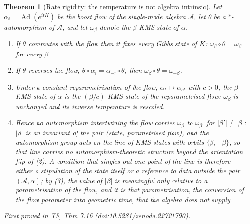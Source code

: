 \documentclass[11pt]{article}
\newtheorem{theorem}{Theorem}[section]
\theoremstyle{definition}
\theoremstyle{plain}
\providecommand{\Aa}{}\renewcommand{\Aa}{\mathcal{A}}
\begin{document}
\begin{theorem}[Rate rigidity: the temperature is not algebra intrinsic]\label{c:singularity.rate-rigidity-temperature-not-algebra-intrinsic}
Let $\alpha_t = \operatorname{Ad}(e^{itK})$ be the boost flow of the single-mode algebra $\Aa$, let $\theta$ be a $*$-automorphism of $\Aa$, and let $\omega_\beta$ denote the $\beta$-KMS state of $\alpha$.
\begin{enumerate}
\item If $\theta$ commutes with the flow then it fixes every Gibbs state of $K$: $\omega_\beta \circ \theta = \omega_\beta$ for every $\beta$.
\item If $\theta$ reverses the flow, $\theta\circ\alpha_t = \alpha_{-t}\circ\theta$, then $\omega_\beta\circ\theta = \omega_{-\beta}$.
\item Under a constant reparametrisation of the flow, $\alpha_t \mapsto \alpha_{ct}$ with $c > 0$, the $\beta$-KMS state of $\alpha$ is the $(\beta/c)$-KMS state of the reparametrised flow: $\omega_\beta$ is unchanged and its inverse temperature is rescaled.
\item Hence no automorphism intertwining the flow carries $\omega_\beta$ to $\omega_{\beta'}$ for $|\beta'| \neq |\beta|$: $|\beta|$ is an invariant of the pair (state, parametrised flow), and the automorphism group acts on the line of KMS states with orbits $\{\beta, -\beta\}$, so that line carries no automorphism-theoretic structure beyond the orientation flip of (2). A condition that singles out one point of the line is therefore either a stipulation of the state itself or a reference to data outside the pair $(\Aa, \alpha)$; by (3), the value of $|\beta|$ is meaningful only relative to a parametrisation of the flow, and it is that parametrisation, the conversion of the flow parameter into geometric time, that the algebra does not supply.
\end{enumerate}
\emph{First proved in} T5, Thm 7.16 (\href{https://doi.org/10.5281/zenodo.22721790}{doi:10.5281/zenodo.22721790}).
\end{theorem}
\end{document}

